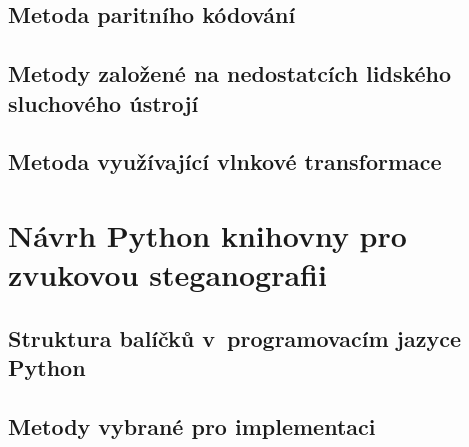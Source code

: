 \blindtext

\section{Metoda paritního kódování}
\label{sec:parity-coding}


\blindtext

\blindtext

\blindtext

\section{Metody založené na nedostatcích lidského sluchového ústrojí}
\label{sec:has}


\blindtext

\blindtext

\blindtext

\section{Metoda využívající vlnkové transformace}
\label{sec:wavelet-transform}


\blindtext


\chapter{Návrh Python knihovny pro zvukovou steganografii}
\label{cha:library-design}


\blindtext

\section{Struktura balíčků v~programovacím jazyce Python}
\label{sec:python-package-structure}


\blindtext

\blindtext

\section{Metody vybrané pro implementaci}
\label{sec:chosen-methods}

